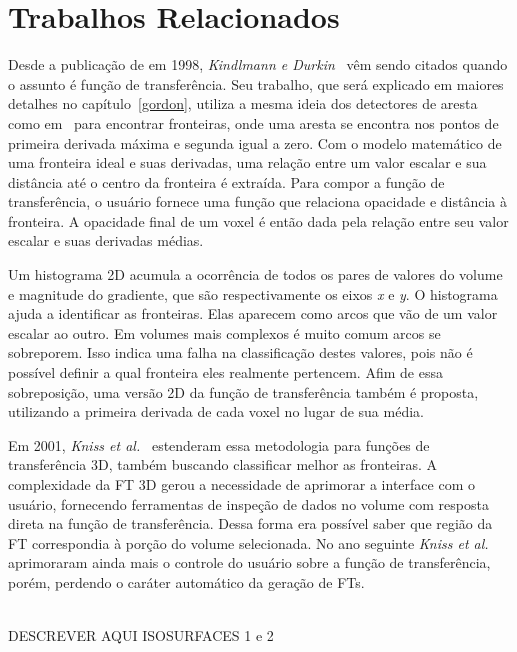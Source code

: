 
\chapter{Trabalhos Relacionados}
\label{related}
	Desde a publicação de  em 1998, \textit{Kindlmann e Durkin}~\cite{gordon} vêm sendo citados quando o assunto é função de transferência. Seu trabalho, que será explicado em maiores detalhes no capítulo~\ref{gordon}, utiliza a mesma ideia dos detectores de aresta como em~\cite{canny} para encontrar fronteiras, onde uma aresta se encontra nos pontos de primeira derivada máxima e segunda igual a zero. Com o modelo matemático de uma fronteira ideal e suas derivadas, uma relação entre um valor escalar e sua distância até o centro da fronteira é extraída. Para compor a função de transferência, o usuário fornece uma função que relaciona opacidade e distância à fronteira. A opacidade final de um voxel é então dada pela relação entre seu valor escalar e suas derivadas médias. 
	
	Um histograma 2D acumula a ocorrência de todos os pares de valores do volume e magnitude do gradiente, que são respectivamente os eixos \textit{x} e \textit{y}. O histograma ajuda a identificar as fronteiras. Elas aparecem como arcos que vão de um valor escalar ao outro. Em volumes mais complexos é muito comum arcos se sobreporem. Isso indica uma falha na classificação destes valores, pois não é possível definir a qual fronteira eles realmente pertencem. Afim de essa sobreposição, uma versão 2D da função de transferência também é proposta, utilizando a primeira derivada de cada voxel no lugar de sua média.
	
	Em 2001, \textit{Kniss et al.}~\cite{kniss1} estenderam essa metodologia para funções de transferência 3D, também buscando classificar melhor as fronteiras. A complexidade da FT 3D gerou a necessidade de aprimorar a interface com o usuário, fornecendo ferramentas de inspeção de dados no volume com resposta direta na função de transferência. Dessa forma era possível saber que região da FT correspondia à porção do volume selecionada. No ano seguinte \textit{Kniss et al.}~\cite{kniss2} aprimoraram ainda mais o controle do usuário sobre a função de transferência, porém, perdendo o caráter automático da geração de FTs.
	
	\\DESCREVER AQUI ISOSURFACES 1 e 2\\
	
